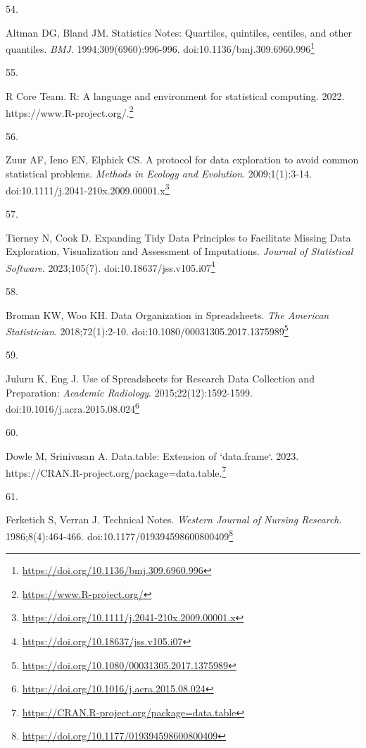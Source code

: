 \documentclass[
]{book}
\newlength{\cslhangindent}
\newlength{\csllabelwidth}
\newlength{\cslentryspacingunit} %
\newenvironment{CSLReferences}[2] %
 {%
  \setlength{\parindent}{0pt}
  \ifodd #1
  \let\oldpar\par
  \def\par{\hangindent=\cslhangindent\oldpar}
  \fi
  \setlength{\parskip}{#2\cslentryspacingunit}
 }%
 {}
\newcommand{\CSLLeftMargin}[1]{\parbox[t]{\csllabelwidth}{#1}}
\newcommand{\CSLRightInline}[1]{\parbox[t]{\linewidth - \csllabelwidth}{#1}\break}
\renewcommand{\href}[2]{#2\footnote{\url{#1}}}
\begin{document}
\begin{CSLReferences}{0}{0}
\leavevmode{}%
\CSLLeftMargin{54. }%
\CSLRightInline{Altman DG, Bland JM. Statistics Notes: Quartiles, quintiles, centiles, and other quantiles. \emph{BMJ}. 1994;309(6960):996-996. doi:\href{https://doi.org/10.1136/bmj.309.6960.996}{10.1136/bmj.309.6960.996}}

\leavevmode{}%
\CSLLeftMargin{55. }%
\CSLRightInline{R Core Team. R: A language and environment for statistical computing. 2022. \href{https://www.R-project.org/}{https://www.R-project.org/.}}

\leavevmode{}%
\CSLLeftMargin{56. }%
\CSLRightInline{Zuur AF, Ieno EN, Elphick CS. A protocol for data exploration to avoid common statistical problems. \emph{Methods in Ecology and Evolution}. 2009;1(1):3-14. doi:\href{https://doi.org/10.1111/j.2041-210x.2009.00001.x}{10.1111/j.2041-210x.2009.00001.x}}

\leavevmode{}%
\CSLLeftMargin{57. }%
\CSLRightInline{Tierney N, Cook D. Expanding Tidy Data Principles to Facilitate Missing Data Exploration, Visualization and Assessment of Imputations. \emph{Journal of Statistical Software}. 2023;105(7). doi:\href{https://doi.org/10.18637/jss.v105.i07}{10.18637/jss.v105.i07}}

\leavevmode{}%
\CSLLeftMargin{58. }%
\CSLRightInline{Broman KW, Woo KH. Data Organization in Spreadsheets. \emph{The American Statistician}. 2018;72(1):2-10. doi:\href{https://doi.org/10.1080/00031305.2017.1375989}{10.1080/00031305.2017.1375989}}

\leavevmode{}%
\CSLLeftMargin{59. }%
\CSLRightInline{Juluru K, Eng J. Use of Spreadsheets for Research Data Collection and Preparation: \emph{Academic Radiology}. 2015;22(12):1592-1599. doi:\href{https://doi.org/10.1016/j.acra.2015.08.024}{10.1016/j.acra.2015.08.024}}

\leavevmode{}%
\CSLLeftMargin{60. }%
\CSLRightInline{Dowle M, Srinivasan A. Data.table: Extension of `data.frame`. 2023. \href{https://CRAN.R-project.org/package=data.table}{https://CRAN.R-project.org/package=data.table.}}

\leavevmode{}%
\CSLLeftMargin{61. }%
\CSLRightInline{Ferketich S, Verran J. Technical Notes. \emph{Western Journal of Nursing Research}. 1986;8(4):464-466. doi:\href{https://doi.org/10.1177/019394598600800409}{10.1177/019394598600800409}}


\end{CSLReferences}
\end{document}
